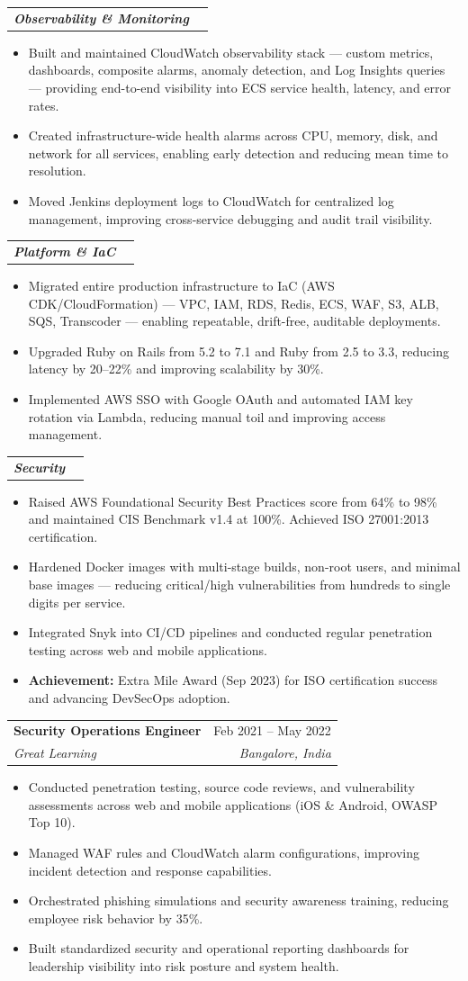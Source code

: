 \documentclass[letterpaper,11pt]{article}
\makeatletter
\newcommand{\resumeItem}[1]{\item\small{#1 \vspace{-2pt}}}
\newcommand{\resumeSubheading}[4]{
  \vspace{-2pt}\item
    \begin{tabular*}{0.97\textwidth}[t]{l@{\extracolsep{\fill}}r}
      \textbf{#1} & #2 \\
      \textit{\small#3} & \textit{\small #4} \\
    \end{tabular*}\vspace{-7pt}
}
\newcommand{\resumeSubheadingContinue}[2]{
  \vspace{2pt}
  \begin{tabular*}{0.97\textwidth}[t]{l@{\extracolsep{\fill}}r}
    \textit{\small\textbf{#1}} \\
  \end{tabular*}\vspace{-7pt}
}
\newcommand{\resumeItemListStart}{\begin{itemize}}
\newcommand{\resumeItemListEnd}{\end{itemize}\vspace{-5pt}}
\makeatother
\begin{document}
    \resumeSubheadingContinue{Observability \& Monitoring}{}
    \resumeItemListStart
        \resumeItem{Built and maintained CloudWatch observability stack --- custom metrics, dashboards, composite alarms, anomaly detection, and Log Insights queries --- providing end-to-end visibility into ECS service health, latency, and error rates.}
        \resumeItem{Created infrastructure-wide health alarms across CPU, memory, disk, and network for all services, enabling early detection and reducing mean time to resolution.}
        \resumeItem{Moved Jenkins deployment logs to CloudWatch for centralized log management, improving cross-service debugging and audit trail visibility.}
    \resumeItemListEnd

    \resumeSubheadingContinue{Platform \& IaC}{}
    \resumeItemListStart
        \resumeItem{Migrated entire production infrastructure to IaC (AWS CDK/CloudFormation) --- VPC, IAM, RDS, Redis, ECS, WAF, S3, ALB, SQS, Transcoder --- enabling repeatable, drift-free, auditable deployments.}
        \resumeItem{Upgraded Ruby on Rails from 5.2 to 7.1 and Ruby from 2.5 to 3.3, reducing latency by 20--22\% and improving scalability by 30\%.}
        \resumeItem{Implemented AWS SSO with Google OAuth and automated IAM key rotation via Lambda, reducing manual toil and improving access management.}
    \resumeItemListEnd

    \resumeSubheadingContinue{Security}{}
    \resumeItemListStart
        \resumeItem{Raised AWS Foundational Security Best Practices score from 64\% to 98\% and maintained CIS Benchmark v1.4 at 100\%. Achieved ISO 27001:2013 certification.}
        \resumeItem{Hardened Docker images with multi-stage builds, non-root users, and minimal base images --- reducing critical/high vulnerabilities from hundreds to single digits per service.}
        \resumeItem{Integrated Snyk into CI/CD pipelines and conducted regular penetration testing across web and mobile applications.}
        \resumeItem{\textbf{Achievement:} Extra Mile Award (Sep 2023) for ISO certification success and advancing DevSecOps adoption.}
    \resumeItemListEnd

    \resumeSubheading
      {Security Operations Engineer}{Feb 2021 -- May 2022}
      {Great Learning}{Bangalore, India}
    \resumeItemListStart
        \resumeItem{Conducted penetration testing, source code reviews, and vulnerability assessments across web and mobile applications (iOS \& Android, OWASP Top 10).}
        \resumeItem{Managed WAF rules and CloudWatch alarm configurations, improving incident detection and response capabilities.}
        \resumeItem{Orchestrated phishing simulations and security awareness training, reducing employee risk behavior by 35\%.}
        \resumeItem{Built standardized security and operational reporting dashboards for leadership visibility into risk posture and system health.}
    \resumeItemListEnd
\end{document}
